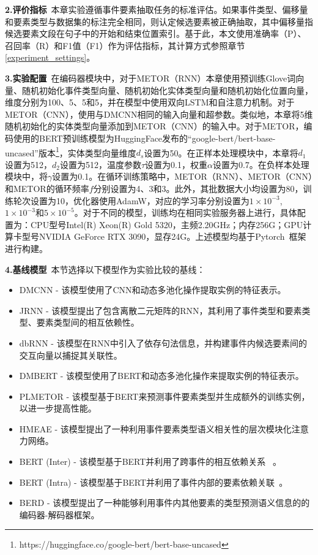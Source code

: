 \textbf{2.评价指标}~本章实验遵循事件要素抽取任务的标准评估。如果事件类型、偏移量和要素类型与数据集的标注完全相同，则认定候选要素被正确抽取，其中偏移量指候选要素文段在句子中的开始和结束位置索引。基于此，本文使用准确率（P）、召回率（R）和F1值（F1）作为评估指标，其计算方式参照章节\ref{experiment_settings}。

\textbf{3.实验配置}~在编码器模块中，对于METOR（RNN）本章使用预训练Glove词向量、随机初始化事件类型向量、随机初始化实体类型向量和随机初始化位置向量，维度分别为100、5、5和5，并在模型中使用双向LSTM和自注意力机制。对于METOR（CNN），使用与DMCNN相同的输入向量和超参数。类似地，本章将5维随机初始化的实体类型向量添加到METOR（CNN）的输入中。对于METOR，编码使用的BERT预训练模型为HuggingFace发布的“google-bert/bert-base-uncased”版本\footnote{https://huggingface.co/google-bert/bert-base-uncased}，实体类型向量维度$d_{s}$设置为50。在正样本处理模块中，本章将$d_{1}$设置为512，$d_{2}$设置为512，温度参数$\tau$设置为0.1，权重$\alpha$设置为0.7。在负样本处理模块中，将$\gamma$设置为0.1。在循环训练策略中，METOR（RNN）、METOR（CNN）和METOR的循环频率$f$分别设置为4、3和3。此外，其批数据大小均设置为80，训练轮次设置为10，优化器使用AdamW，对应的学习率分别设置为$1 \times 10^{-3}$, $1 \times 10^{-3}$和$5 \times 10^{-5}$。对于不同的模型，训练均在相同实验服务器上进行，具体配置为：CPU型号Intel(R) Xeon(R) Gold 5320，主频2.20GHz；内存256G；GPU计算卡型号NVIDIA GeForce RTX 3090，显存24G。上述模型均基于Pytorch~\cite{paszke2017automatic}框架进行构建。

\textbf{4.基线模型}~本节选择以下模型作为实验比较的基线：

\begin{itemize}
\item DMCNN \cite{chen2015event} - 该模型使用了CNN和动态多池化操作提取实例的特征表示。
\item JRNN \cite{nguyen2016joint} - 该模型提出了包含离散二元矩阵的RNN，其利用了事件类型和要素类型、要素类型间的相互依赖性。
\item dbRNN \cite{sha2018jointly} - 该模型在RNN中引入了依存句法信息，并构建事件内候选要素间的交互向量以捕捉其关联性。
\item DMBERT \cite{wang2019adversarial} - 该模型使用了BERT和动态多池化操作来提取实例的特征表示。
\item PLMETOR \cite{yang2019exploring} - 该模型基于BERT来预测事件要素类型并生成额外的训练实例，以进一步提高性能。
\item HMEAE \cite{wang2019hmeae} - 该模型提出了一种利用事件要素类型语义相关性的层次模块化注意力网络。
\item BERT (Inter) \cite{xiangyu2021capturing} - 该模型基于BERT并利用了跨事件的相互依赖关系
~\cite{nguyen2016joint}。
\item BERT (Intra) \cite{xiangyu2021capturing} - 该模型基于BERT并利用了事件内部的要素依赖关联~\cite{sha2018jointly}。 
\item BERD \cite{xiangyu2021capturing} - 该模型提出了一种能够利用事件内其他要素的类型预测语义信息的的编码器-解码器框架。
\end{itemize}

